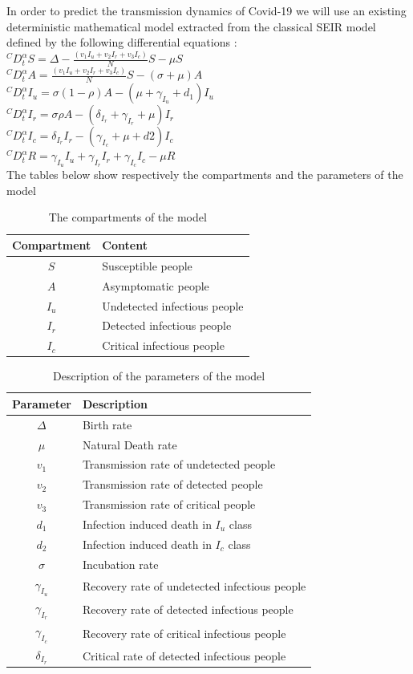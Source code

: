 \documentclass[paper=a4, fontsize=11.5pt]{scrartcl}
\numberwithin{equation}{section}		%
\numberwithin{figure}{section}			%
\numberwithin{table}{section}				%
\begin{document}
\quad In order to predict the transmission dynamics of Covid-19 we will use an existing deterministic mathematical model extracted from the classical SEIR model defined by the following differential equations :\\
\medskip
$^C D_t^\alpha S=\Delta - \frac{(v_1I_u + v_2I_r + v_3I_c)}{N}S - \mu S$\\
$^C D_t^\alpha A=\frac{(v_1I_u + v_2I_r + v_3I_c)}{N}S -( \sigma + \mu )A$\\
$^C D_t^\alpha I_u=\sigma (1 - \rho)A - (\mu + \gamma _{I_u }+ d_1) I_u$\\
$^C D_t^\alpha I_r=\sigma\rho A - (\delta_{I_r }+ \gamma _{I_r }+ \mu) I_r$\\
$^C D_t^\alpha I_c=\delta_{I_r }I_r - (\gamma _{I_c }+ \mu + d2) I_c$\\
$^C D_t^\alpha R=\gamma_{I_u }I_u + \gamma_{I_r }I_r + \gamma_{I_c }I_c - \mu R$\\
\medskip
The tables below show respectively the compartments and the parameters of the model
\begin{table}[h]
\centering
\begin{tabular}{cl}  
	\hline
	Compartment & Content\\
	\hline
	$S$  & Susceptible people\\
	$A$  & Asymptomatic people\\
	$I_u$  & Undetected infectious people\\
	$I_r$  & Detected infectious people\\
	$I_c$  & Critical infectious people\\
	\hline
\end{tabular}
\caption{The compartments of the model}
\label{tab:Table1}
\end{table}
\medskip
\begin{table}[!h]
\centering
\begin{tabular}{cl}  
	\hline
	Parameter & Description\\
	\hline
	$\Delta$ & Birth rate\\
	$\mu$ & Natural Death rate\\
	$v_1$  & Transmission rate of undetected people\\
	$v_2$  & Transmission rate of detected people\\
	$v_3$  & Transmission rate of critical people\\
	$d_1$  &  Infection induced death in $I_u$ class\\
	$d_2$  &  Infection induced death in $I_c$ class\\
	$\sigma$ & Incubation rate\\
	$\gamma_{I_u }$ &Recovery rate of undetected infectious people\\
	$\gamma_{I_r }$ &Recovery rate of detected infectious people\\
	$\gamma_{I_c }$ & Recovery rate of critical infectious people\\
	$\delta_{I_r }$ & Critical rate of detected infectious people\\ 
	\hline
\end{tabular}
\caption{Description of the parameters of the model}
\label{tab:Table2}
\end{table}
\end{document}
